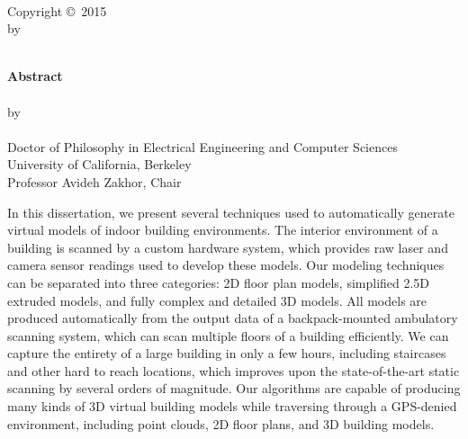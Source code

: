 \documentclass[12pt,onecolumn,oneside]{book}
\begin{document}
\newpage
{\centering
	{\textbf{\mytitle}}\\
	\hfill \break
	\hfill \break
	\hfill \break
	\hfill \break
	\hfill \break
	Copyright \copyright \, 2015\\
	by\\
	\myauthor\\
}


\newpage
{}
\setcounter{page}{1}

{\centering
	{\textbf{Abstract}}\\
	\hfill \break
	\mytitle\\
	\hfill \break
	by\\
	\hfill \break
	\myauthor\\
	\hfill \break
	Doctor of Philosophy in Electrical Engineering and Computer Sciences\\
	\hfill \break
	University of California, Berkeley\\
	\hfill \break
	Professor Avideh Zakhor, Chair\\
	\hfill \break
}

In this dissertation, we present several techniques used to automatically generate virtual models of indoor building environments.  The interior environment of a building is scanned by a custom hardware system, which provides raw laser and camera sensor readings used to develop these models.  Our modeling techniques can be separated into three categories:  2D floor plan models, simplified 2.5D extruded models, and fully complex and detailed 3D models.  All models are produced automatically from the output data of a backpack-mounted ambulatory scanning system, which can scan multiple floors of a building efficiently.  We can capture the entirety of a large building in only a few hours, including staircases and other hard to reach locations, which improves upon the state-of-the-art static scanning by several orders of magnitude.  Our algorithms are capable of producing many kinds of 3D virtual building models while traversing through a GPS-denied environment, including point clouds, 2D floor plans, and 3D building models.
\end{document}
